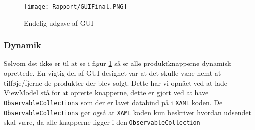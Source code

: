 \begin{figure}[H]
\centering
	\texttt{[image: Rapport/GUIFinal.PNG]}
	\caption{Endelig udgave af GUI}
	\label{fig:GUIFinal}
\end{figure}

\subsubsection{Dynamik}
Selvom det ikke er til at se i figur \ref{fig:GUIFinal} så er alle produktknapperne dynamisk oprettede. 
En vigtig del af GUI designet var at det skulle være nemt at tilføje/fjerne de produkter der blev solgt.
Dette har vi opnået ved at lade ViewModel stå for at oprette knapperne, dette er gjort ved at have \texttt{ObservableCollections} som der er lavet databind på i \texttt{XAML} koden.
De \texttt{ObservableCollections} gør også at \texttt{XAML} koden kun beskriver hvordan udsendet skal være, da alle knapperne ligger i den \texttt{ObservableCollection}
